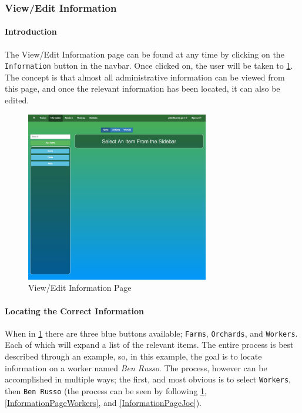 \documentclass[11pt]{article}
\begin{document}
\subsubsection{View/Edit Information}
\label{webInformation}
\paragraph{Introduction}The View/Edit Information page can be found at any time by clicking on the \texttt{Information} button in the navbar. Once clicked on, the user will be taken to \ref{InformationPage}. The concept is that almost all administrative information can be viewed from this page, and once the relevant information has been located, it can also be edited.

\begin{figure}
 \centering
 \includegraphics[width=8cm, keepaspectratio]{Images/UsingSystem/WebInfo.png}
 \caption{View/Edit Information Page}
 \label{InformationPage}
\end{figure}

\paragraph{Locating the Correct Information}When in \ref{InformationPage} there are three blue buttons available; \texttt{Farms}, \texttt{Orchards}, and \texttt{Workers}. Each of which will expand a list of the relevant items. The entire process is best described through an example, so, in this example, the goal is to locate information on a worker named \textit{Ben Russo}. The process, however can be accomplished in multiple ways; the first, and most obvious is to select \texttt{Workers}, then \texttt{Ben Russo} (the process can be seen by following \ref{InformationPage}, \ref{InformationPageWorkers}, and \ref{InformationPageJoe}).
\end{document}
